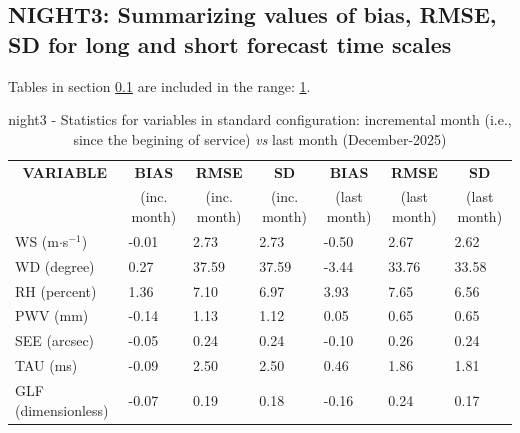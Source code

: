 \subsection{NIGHT3: Summarizing values of bias, RMSE, SD for long and short forecast time scales}\label{subsec:night3:stat}
Tables in section \ref{subsec:night3:stat} are included in the range: \ref{tab:night3:statBEF}.
\begin{table}[h!]
\begin{center}
\begin{tabular}{|l|l|l|l|l|l|l|}
\hline
\multicolumn{1}{|c|}{\cellcolor[HTML]{C0C0C0}\textbf{VARIABLE}} & \multicolumn{1}{c|}{\cellcolor[HTML]{C0C0C0}\textbf{BIAS}} & \multicolumn{1}{c|}{\cellcolor[HTML]{C0C0C0}\textbf{RMSE}} & \multicolumn{1}{c|}{\cellcolor[HTML]{C0C0C0}\textbf{SD}} & \multicolumn{1}{c|}{\cellcolor[HTML]{C0C0C0}\textbf{BIAS}} & \multicolumn{1}{c|}{\cellcolor[HTML]{C0C0C0}\textbf{RMSE}} & \multicolumn{1}{c|}{\cellcolor[HTML]{C0C0C0}\textbf{SD}}\\
\multicolumn{1}{|c|}{\cellcolor[HTML]{C0C0C0}} & \multicolumn{1}{c|}{\cellcolor[HTML]{C0C0C0}(inc. month)} & \multicolumn{1}{c|}{\cellcolor[HTML]{C0C0C0}(inc. month)} & \multicolumn{1}{c|}{\cellcolor[HTML]{C0C0C0}(inc. month)} & \multicolumn{1}{c|}{\cellcolor[HTML]{C0C0C0}(last month)} & \multicolumn{1}{c|}{\cellcolor[HTML]{C0C0C0}(last month)} & \multicolumn{1}{c|}{\cellcolor[HTML]{C0C0C0}(last month)}\\\hline
\cellcolor[HTML]{C0C0C0}WS (m$\cdot$s$^{-1}$) &     -0.01  &      2.73  &      2.73  &     -0.50     &      2.67     &      2.62\\
\cellcolor[HTML]{C0C0C0}WD (degree)           &      0.27  &     37.59  &     37.59  &     -3.44     &     33.76     &     33.58\\
\cellcolor[HTML]{C0C0C0}RH (percent)          &      1.36  &      7.10  &      6.97  &      3.93     &      7.65     &      6.56\\
\cellcolor[HTML]{C0C0C0}PWV (mm)              &     -0.14 &      1.13 &      1.12 &      0.05    &      0.65    &      0.65\\
\cellcolor[HTML]{C0C0C0}SEE (arcsec)          &     -0.05 &      0.24 &      0.24 &     -0.10    &      0.26    &      0.24\\
\cellcolor[HTML]{C0C0C0}TAU (ms)              &     -0.09 &      2.50 &      2.50 &      0.46    &      1.86    &      1.81\\
\cellcolor[HTML]{C0C0C0}GLF (dimensionless)   &     -0.07 &      0.19 &      0.18 &     -0.16    &      0.24    &      0.17\\
\hline
\end{tabular}
\caption{night3 - Statistics for variables in standard configuration: incremental month (i.e., since the begining of service) \textit{vs} last month (December-2025)}\label{tab:night3:statBEF}
\end{center}
\end{table}

